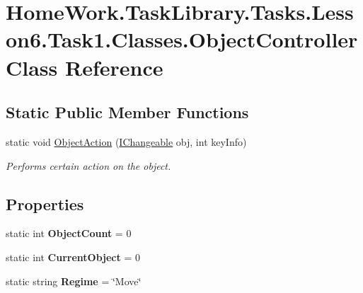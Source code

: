 \hypertarget{class_home_work_1_1_task_library_1_1_tasks_1_1_lesson6_1_1_task1_1_1_classes_1_1_object_controller}{}\section{Home\+Work.\+Task\+Library.\+Tasks.\+Lesson6.\+Task1.\+Classes.\+Object\+Controller Class Reference}
\label{class_home_work_1_1_task_library_1_1_tasks_1_1_lesson6_1_1_task1_1_1_classes_1_1_object_controller}
\subsection*{Static Public Member Functions}
\begin{DoxyCompactItemize}
\item 
static void \mbox{\hyperlink{class_home_work_1_1_task_library_1_1_tasks_1_1_lesson6_1_1_task1_1_1_classes_1_1_object_controller_a37101260e317a354744d66c03bbec0a5}{Object\+Action}} (\mbox{\hyperlink{interface_home_work_1_1_task_library_1_1_tasks_1_1_lesson6_1_1_task1_1_1_interfaces_1_1_i_changeable}{I\+Changeable}} obj, int key\+Info)
\begin{DoxyCompactList}\small\item\em Performs certain action on the object. \end{DoxyCompactList}\end{DoxyCompactItemize}
\subsection*{Properties}
\begin{DoxyCompactItemize}
\item 
\mbox{\label{class_home_work_1_1_task_library_1_1_tasks_1_1_lesson6_1_1_task1_1_1_classes_1_1_object_controller_a287f07dfb179d1e2fa14a4bc1fe5bd9c}} 
static int {\bfseries Object\+Count} = 0
\item 
\mbox{\label{class_home_work_1_1_task_library_1_1_tasks_1_1_lesson6_1_1_task1_1_1_classes_1_1_object_controller_a6e6ecef600f0d0603ab6f418e51117b3}} 
static int {\bfseries Current\+Object} = 0
\item 
\mbox{\label{class_home_work_1_1_task_library_1_1_tasks_1_1_lesson6_1_1_task1_1_1_classes_1_1_object_controller_ac6cb82c6a604f72682f4338d55daf28f}} 
static string {\bfseries Regime} = \char`\"{}Move\char`\"{}
\end{DoxyCompactItemize}


